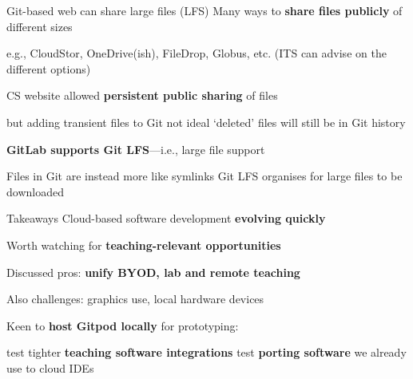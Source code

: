\documentclass[aspectratio=169,t]{beamer}
\begin{document}
\begin{dframe}{Git-based web can share large files (LFS)}
  \1 Many ways to \textbf{share files publicly} of different sizes

  \2 e.g., CloudStor, OneDrive(ish), FileDrop, Globus, etc.
  \2 (ITS can advise on the different options)

  \1 CS website allowed \textbf{persistent public sharing} of files

  \2 but adding transient files to Git not ideal
  \2 `deleted' files will still be in Git history

  \1 \textbf{GitLab supports Git LFS}---i.e., large file support

  \2 Files in Git are instead more like symlinks
  \2 Git LFS organises for large files to be downloaded

\end{dframe}

\begin{dframe}{Takeaways}
  \1 Cloud-based software development \textbf{evolving quickly}

  \2 Worth watching for \textbf{teaching-relevant opportunities}

  \medskip
  
  \1 Discussed pros: \textbf{unify BYOD, lab and remote teaching}

  \medskip
  
  \1 Also challenges: graphics use, local hardware devices

  \medskip
  
  \1 Keen to \textbf{host Gitpod locally} for prototyping:
  
  \2 test tighter \textbf{teaching software integrations}
  \2 test \textbf{porting software} we already use to cloud IDEs

\end{dframe}

\begin{comment}
\begin{dframe}{FaaS, serverless and responsiveness}
  \1 Edge appearance
\end{dframe}
\end{comment}
\end{document}
